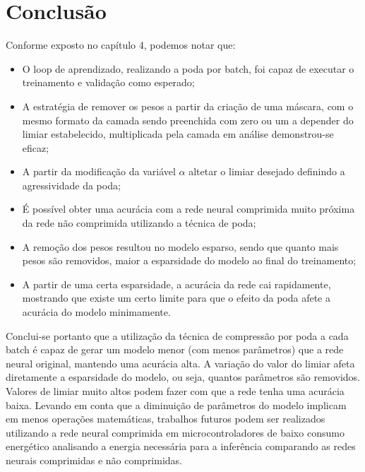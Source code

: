 \chapter[Conclusão]{Conclusão}
\label{ch:cap5}

Conforme exposto no capítulo 4, podemos notar que:

\begin{itemize}
   \item O loop de aprendizado, realizando a poda por batch, foi capaz de executar o treinamento e validação como esperado;
   \item A estratégia de remover os pesos a partir da criação de uma máscara, com o mesmo formato da camada sendo preenchida com zero ou um a depender do limiar estabelecido, multiplicada pela camada em análise demonstrou-se eficaz;
   \item A partir da modificação da variável $\alpha$ altetar o limiar desejado definindo a agressividade da poda;
   \item É possível obter uma acurácia com a rede neural comprimida muito próxima da rede não comprimida utilizando a técnica de poda;
   \item A remoção dos pesos resultou no modelo esparso, sendo que quanto mais pesos são removidos, maior a esparsidade do modelo ao final do treinamento;
   \item A partir de uma certa esparsidade, a acurácia da rede cai rapidamente, mostrando que existe um certo limite para que o efeito da poda afete a acurácia do modelo minimamente.
\end{itemize}

Conclui-se portanto que a utilização da técnica de compressão por poda a cada batch é capaz de gerar um modelo menor (com menos parâmetros) que a rede neural original, mantendo uma acurácia alta. A variação do valor do limiar afeta diretamente a esparsidade do modelo, ou seja, quantos parâmetros são removidos. Valores de limiar muito altos podem fazer com que a rede tenha uma acurácia baixa. Levando em conta que a diminuição de parâmetros do modelo implicam em menos operações matemáticas, trabalhos futuros podem ser realizados utilizando a rede neural comprimida em microcontroladores de baixo consumo energético analisando a energia necessária para a inferência comparando as redes neurais comprimidas e não comprimidas.